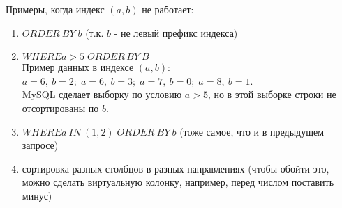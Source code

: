 Примеры, когда индекс $(a, b)$ не работает:
\begin{enumerate}
\item $ORDER\:BY \; b$ (т.к. $b$ - не левый префикс индекса)
\item $WHERE a>5 \; ORDER\,BY\:B$ \\
Пример данных в индексе $(a, b)$: $a=6,\:b=2; \; a=6,\:b=3; \; a=7,\: b=0; \; a=8,\:b=1$.\\
MySQL сделает выборку по условию $a>5$, но в этой выборке строки не отсортированы по $b$.
\item $WHERE a\:IN\:(1,2) \; ORDER\:BY\:b$ (тоже самое, что и в предыдущем запросе)
\item сортировка разных столбцов в разных направлениях (чтобы обойти это, можно сделать виртуальную колонку, например, перед числом поставить минус)
\end{enumerate}